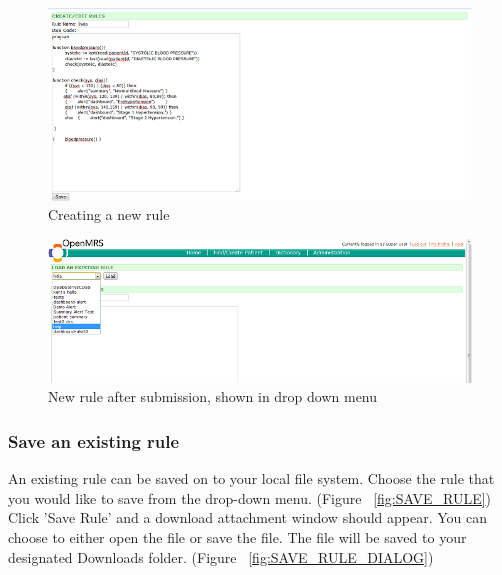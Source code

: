 \documentclass[12pt,letterpaper]{article}
\begin{document}
\begin{figure}\begin{center}
\includegraphics[width=6.5in]{user_guide/new_rule.png}
\end{center}
\caption{Creating a new rule}
\label{fig:NEW_RULE}
\end{figure}

\begin{figure}\begin{center}
\includegraphics[width=6.5in]{user_guide/new_rule_success.png}
\end{center}
\caption{New rule after submission, shown in drop down menu}
\label{fig:NEW_RULE_SUCCESS}
\end{figure}

\subsubsection{Save an existing rule}
An existing rule can be saved on to your local file system. Choose the rule that you would like to save from the drop-down menu.
(Figure ~\ref{fig:SAVE_RULE})
Click 'Save Rule' and a download attachment window should appear. You can choose to either open the file or save the file. The file will be saved to your designated Downloads folder.
(Figure ~\ref{fig:SAVE_RULE_DIALOG})
\end{document}
